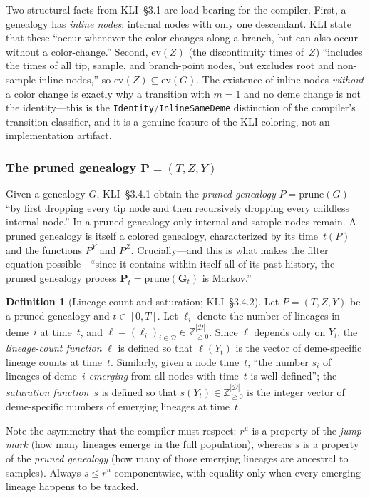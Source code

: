 \documentclass[11pt,leqno]{article}
\newcommand{\Gr}{\mathbf{G}}        %
\renewcommand{\Pr}{\mathbf{P}}      %
\newcommand{\Demes}{\mathcal{D}}    %
\newcommand{\Zp}{\mathbb{Z}_{\ge 0}}
\newcommand{\code}[1]{\texttt{#1}}
\theoremstyle{plain}
\theoremstyle{definition}
\newtheorem{definition}[theorem]{Definition}
\begin{document}
Two structural facts from KLI~\S3.1 are load-bearing for the
compiler.  First, a genealogy has \emph{inline nodes}: internal nodes
with only one descendant.  KLI state that these ``occur whenever the
color changes along a branch, but can also occur without a
color-change.''  Second, $\mathrm{ev}(Z)$ (the discontinuity times
of~$Z$) ``includes the times of all tip, sample, and branch-point
nodes, but excludes root and non-sample inline nodes,'' so
$\mathrm{ev}(Z) \subseteq \mathrm{ev}(G)$.  The existence of
inline nodes \emph{without} a color change is exactly why a transition
with $m = 1$ and no deme change is not the identity---this is the
\code{Identity}/\code{InlineSameDeme} distinction of the compiler's
transition classifier, and it is a genuine feature of the KLI
coloring, not an implementation artifact.

\subsubsection{The pruned genealogy $\Pr = (T, Z, Y)$}

Given a genealogy $G$, KLI~\S3.4.1 obtain the \emph{pruned genealogy}
$P = \mathrm{prune}(G)$ ``by first dropping every tip node and then
recursively dropping every childless internal node.''  In a pruned
genealogy only internal and sample nodes remain.  A pruned genealogy
is itself a colored genealogy, characterized by its time~$t(P)$ and
the functions $P^Y$ and $P^Z$.  Crucially---and this is what makes the
filter equation possible---``since it contains within itself all of its
past history, the pruned genealogy process
$\Pr_t = \mathrm{prune}(\Gr_t)$ is Markov.''

\begin{definition}[Lineage count and saturation; KLI~\S3.4.2]
Let $P = (T,Z,Y)$ be a pruned genealogy and $t \in [0,T]$.
Let $\ell_i$ denote the number of lineages in deme~$i$ at time~$t$,
and $\ell = (\ell_i)_{i \in \Demes} \in \Zp^{|\Demes|}$.  Since
$\ell$ depends only on $Y_t$, the \emph{lineage-count function} $\ell$
is defined so that $\ell(Y_t)$ is the vector of deme-specific lineage
counts at time~$t$.  Similarly, given a node time~$t$, ``the number
$s_i$ of lineages of deme~$i$ \emph{emerging} from all nodes with
time~$t$ is well defined''; the \emph{saturation function}~$s$ is
defined so that $s(Y_t) \in \Zp^{|\Demes|}$ is the integer vector of
deme-specific numbers of emerging lineages at time~$t$.
\end{definition}

Note the asymmetry that the compiler must respect: $r^u$ is a property
of the \emph{jump mark} (how many lineages emerge in the full
population), whereas $s$ is a property of the \emph{pruned genealogy}
(how many of those emerging lineages are ancestral to samples).  Always
$s \le r^u$ componentwise, with equality only when every emerging
lineage happens to be tracked.
\end{document}
